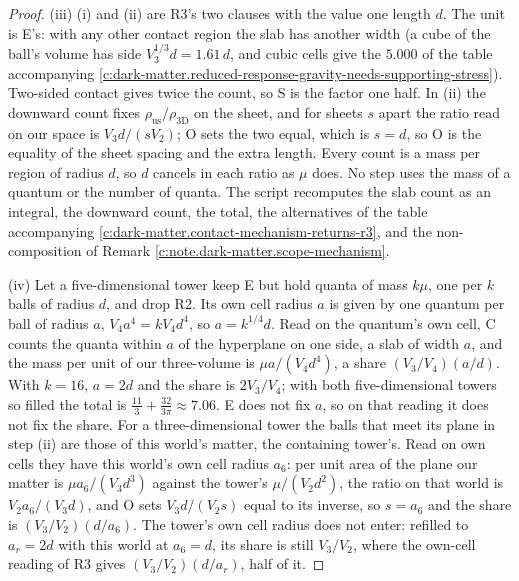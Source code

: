 \documentclass[11pt]{article}
\theoremstyle{definition}
\theoremstyle{plain}
\begin{document}
\begin{proof}
(iii) (i) and (ii) are R3's two clauses with the value one length $d$. The unit is E's: with any other contact region the slab has another width (a cube of the ball's volume has side $V_{3}^{1/3}d = 1.61\,d$, and cubic cells give the $5.000$ of the table accompanying \ref{c:dark-matter.reduced-response-gravity-needs-supporting-stress}). Two-sided contact gives twice the count, so S is the factor one half. In (ii) the downward count fixes $\rho_{\mathrm{us}}/\rho_{3\mathrm{D}}$ on the sheet, and for sheets $s$ apart the ratio read on our space is $V_{3}d/(sV_{2})$; O sets the two equal, which is $s = d$, so O is the equality of the sheet spacing and the extra length. Every count is a mass per region of radius $d$, so $d$ cancels in each ratio as $\mu$ does. No step uses the mass of a quantum or the number of quanta. The script recomputes the slab count as an integral, the downward count, the total, the alternatives of the table accompanying \ref{c:dark-matter.contact-mechanism-returns-r3}, and the non-composition of Remark \ref{c:note.dark-matter.scope-mechanism}.

(iv) Let a five-dimensional tower keep E but hold quanta of mass $k\mu$, one per $k$ balls of radius $d$, and drop R2. Its own cell radius $a$ is given by one quantum per ball of radius $a$, $V_{4}a^{4} = kV_{4}d^{4}$, so $a = k^{1/4}d$. Read on the quantum's own cell, C counts the quanta within $a$ of the hyperplane on one side, a slab of width $a$, and the mass per unit of our three-volume is $\mu a/(V_{4}d^{4})$, a share $(V_{3}/V_{4})(a/d)$. With $k = 16$, $a = 2d$ and the share is $2V_{3}/V_{4}$; with both five-dimensional towers so filled the total is $\tfrac{11}{3} + \tfrac{32}{3\pi} \approx 7.06$. E does not fix $a$, so on that reading it does not fix the share. For a three-dimensional tower the balls that meet its plane in step (ii) are those of this world's matter, the containing tower's. Read on own cells they have this world's own cell radius $a_{6}$: per unit area of the plane our matter is $\mu a_{6}/(V_{3}d^{3})$ against the tower's $\mu/(V_{2}d^{2})$, the ratio on that world is $V_{2}a_{6}/(V_{3}d)$, and O sets $V_{3}d/(V_{2}s)$ equal to its inverse, so $s = a_{6}$ and the share is $(V_{3}/V_{2})(d/a_{6})$. The tower's own cell radius does not enter: refilled to $a_{r} = 2d$ with this world at $a_{6} = d$, its share is still $V_{3}/V_{2}$, where the own-cell reading of R3 gives $(V_{3}/V_{2})(d/a_{r})$, half of it.

\end{proof}
\end{document}
